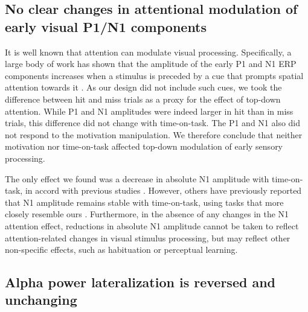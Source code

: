 \documentclass[11pt,]{memoir}
\begin{document}
\hypertarget{no-clear-changes-in-attentional-modulation-of-early-visual-p1n1-components}{%
\subsection{No clear changes in attentional modulation of early visual P1/N1 components}\label{no-clear-changes-in-attentional-modulation-of-early-visual-p1n1-components}}

It is well known that attention can modulate visual processing. Specifically, a large body of work has shown that the amplitude of the early P1 and N1 ERP components increases when a stimulus is preceded by a cue that prompts spatial attention towards it \autocite{Luck1994}. As our design did not include such cues, we took the difference between hit and miss trials as a proxy for the effect of top-down attention. While P1 and N1 amplitudes were indeed larger in hit than in miss trials, this difference did not change with time-on-task. The P1 and N1 also did not respond to the motivation manipulation. We therefore conclude that neither motivation nor time-on-task affected top-down modulation of early sensory processing.

The only effect we found was a decrease in absolute N1 amplitude with time-on-task, in accord with previous studies \autocites{Boksem2005}{Faber2012}. However, others have previously reported that N1 amplitude remains stable with time-on-task, using tasks that more closely resemble ours \autocites{Koelega1992}{Bonnefond2010}. Furthermore, in the absence of any changes in the N1 attention effect, reductions in absolute N1 amplitude cannot be taken to reflect attention-related changes in visual stimulus processing, but may reflect other non-specific effects, such as habituation or perceptual learning.

\hypertarget{alpha-power-lateralization-is-reversed-and-unchanging}{%
\subsection{Alpha power lateralization is reversed and unchanging}\label{alpha-power-lateralization-is-reversed-and-unchanging}}
\end{document}
